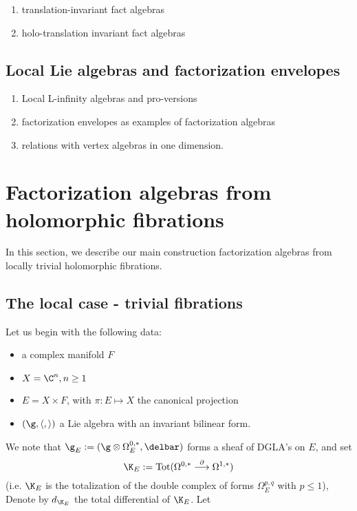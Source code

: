 \documentclass[12pt]{amsart}
\theoremstyle{definition}
\theoremstyle{remark}
\newcommand{\on}{\operatorname}
\begin{document}
\begin{enumerate}
\item {\color{red} translation-invariant fact algebras}
\item {\color{red} holo-translation invariant fact algebras}
\end{enumerate}

\subsection{Local Lie algebras and factorization envelopes}

\begin{enumerate}
\item Local L-infinity algebras and pro-versions
\item factorization envelopes as examples of factorization algebras
\item relations with vertex algebras in one dimension. 
\end{enumerate}

\section{Factorization algebras from holomorphic fibrations}

In this section, we describe our main construction factorization algebras from locally trivial holomorphic fibrations. 

\subsection{The local case - trivial fibrations}

Let us begin with the following data:
\begin{itemize}
\item a complex manifold $F$
\item $X = \C^n, n \geq 1$
\item $E = X \times F$, with $\pi: E \mapsto X $ the canonical projection
\item $(\g, \langle, \rangle)$ a Lie algebra with an invariant bilinear form.
\end{itemize}

We note that $\g_E := (\g \otimes \Omega^{0,*}_E, \delbar)$ forms a sheaf of DGLA's on $E$, and
set
\[
\K_E := \on{Tot} ( \Omega^{0,*} \overset{\partial}{\longrightarrow} \Omega^{1,*})
\]
(i.e. $\K_E$ is the totalization of the double complex of forms $\Omega^{p,q}_E$ with $p \leq 1$), Denote by $d_{\K_E}$ the total differential of $\K_E$. 
Let 
\end{document}
